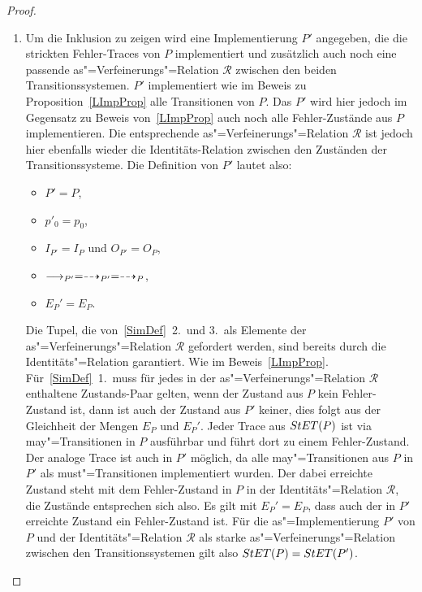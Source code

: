 \begin{proof}\mbox{}
  \begin{enumerate}
    \item Um die Inklusion zu zeigen wird eine Implementierung $P'$ angegeben,
      die die strickten Fehler-Traces von $P$ implementiert und zusätzlich auch
      noch eine passende as"=Verfeinerungs"=Relation $\mathcal{R}$ zwischen den
      beiden Transitionssystemen. $P'$ implementiert wie im Beweis zu
      Proposition~\ref{LImpProp} alle Transitionen von $P$. Das $P'$ wird hier
      jedoch im Gegensatz zu Beweis von~\ref{LImpProp} auch noch alle
      Fehler-Zustände aus $P$ implementieren. Die entsprechende
      as"=Verfeinerungs"=Relation $\mathcal{R}$ ist jedoch hier ebenfalls
      wieder die Identitäts-Relation zwischen den Zuständen der
      Transitionssysteme. Die Definition von $P'$ lautet also:
      \begin{itemize}
        \item $P'=P$,
        \item $p'_0=p_0$,
        \item $I_{P'}=I_P$ und $O_{P'}=O_P$,
        \item $\must _{P'} =\may _{P'} = \may _P$,
        \item $E_P'=E_P$.
      \end{itemize}
      Die Tupel, die von~\ref{SimDef}~2.\ und 3.\ als Elemente der
      as"=Verfeinerungs"=Relation $\mathcal{R}$ gefordert werden, sind bereits
      durch die Identitäts"=Relation garantiert. Wie im Beweis~\ref{LImpProp}.
      Für~\ref{SimDef}~1.\ muss für jedes in der as"=Verfeinerungs"=Relation
      $\mathcal{R}$ enthaltene Zustands-Paar gelten, wenn der Zustand aus $P$
      kein Fehler-Zustand ist, dann ist auch der Zustand aus $P'$ keiner, dies
      folgt aus der Gleichheit der Mengen $E_P$ und $E_P'$. Jeder Trace aus
      $StET (P)$ ist via may"=Transitionen in $P$ ausführbar und führt dort zu
      einem Fehler-Zustand. Der analoge Trace ist auch in $P'$ möglich, da alle
      may"=Transitionen aus $P$ in $P'$ als must"=Transitionen implementiert
      wurden. Der dabei erreichte Zustand steht mit dem Fehler-Zustand in $P$
      in der Identitäts"=Relation $\mathcal{R}$, die Zustände entsprechen sich
      also. Es gilt mit $E_P'=E_P$, dass auch der in $P'$ erreichte Zustand ein
      Fehler-Zustand ist. Für die as"=Implementierung $P'$ von $P$ und der
      Identitäts"=Relation $\mathcal{R}$ als starke as"=Verfeinerungs"=Relation
      zwischen den Transitionssystemen gilt also $StET (P) =StET (P')$.

\end{enumerate}
\end{proof}
